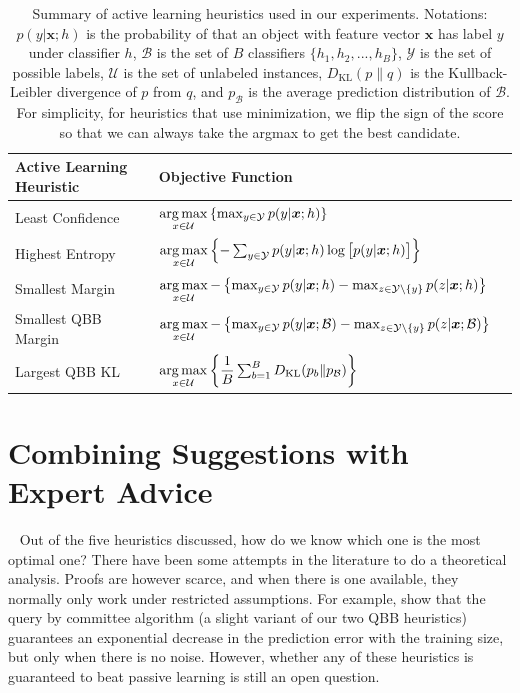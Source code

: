 \documentclass[fleqn,10pt,lineno]{wlpeerj} %
\newcommand{\B}{\mathcal{B}}
\newcommand{\Y}{\mathcal{Y}}
\newcommand{\Unlabelled}{\mathcal{U}}
\newcommand*{\argmax}{\operatornamewithlimits{arg\,max}\limits}
\begin{document}
\begin{table}[h]
	\caption {Summary of active learning heuristics used in our experiments.
			  Notations: $p(y | \bm{x}; h)$ is the probability of that an object
			  with feature vector $\bm{x}$ has label $y$ under classifier $h$,
			  $\B$ is the set of $B$ classifiers $\{h_1, h_2, ..., h_B\}$, $\Y$
			  is the set of possible labels, $\Unlabelled$ is the set of
			  unlabeled instances, $D_{\mathrm{KL}}(p\|q)$ is the
			  Kullback-Leibler divergence of $p$ from $q$, and $p_\B$ is the
			  average prediction distribution of $\B$. For simplicity,
			  for heuristics that use minimization, we flip the sign of the
			  score so that we can always take the argmax to get the best
			  candidate.}
	\label{tab:heuristics}
	\centering
	\begin{tabular}{lll}
		\toprule
		{Active Learning Heuristic}  &  Objective Function  \\
		\midrule
        Least Confidence &
			$\argmax_{x \in \Unlabelled}
			\left\{ \max_{y \in \Y} p(y | \bm{x}; h) \right\}$ \\
		Highest Entropy &
			$\argmax_{x \in \Unlabelled} \left\{-\sum_{y \in \Y} p(y | \bm{x}; h)
            \log \big[ p(y | \bm{x}; h) \big] \right\}$
			\\[2ex]
		Smallest Margin &
			$\argmax_{x \in \Unlabelled} - \left\{ \max_{y \in \Y} p(y | \bm{x}; h) -
            \max_{z \in \Y \setminus \{y\}} p(z | \bm{x}; h)  \right\}$
			\\[2ex]
		Smallest QBB Margin &
			$\argmax_{x \in \Unlabelled} - \left\{ \max_{y \in \Y} p(y | \bm{x}; \B) -
            \max_{z \in \Y \setminus \{y\}} p(z | \bm{x}; \B)  \right\}$
			\\[2ex]
		Largest QBB KL &
			$\argmax_{x \in \Unlabelled} \left\{ \dfrac{1}{B}
               \sum_{b=1}^B D_{\mathrm{KL}}(p_b\|p_\B) \right\}$
			\\
		\bottomrule
	\end{tabular}
\end{table}

\section{Combining Suggestions with Expert Advice}~\label{sec:expert}
Out of the five heuristics discussed, how do we know which one is the most
optimal one? There have been some attempts in the literature to do a
theoretical analysis. Proofs are however scarce, and when there is one
available, they normally only work under restricted assumptions. For example,
\cite{freund97} show that the query by committee algorithm (a slight variant of
our two QBB heuristics) guarantees an exponential decrease in the prediction
error with the training size, but only when there is no noise. However, whether
any of these heuristics is guaranteed to beat passive learning is still an open
question.
\end{document}
